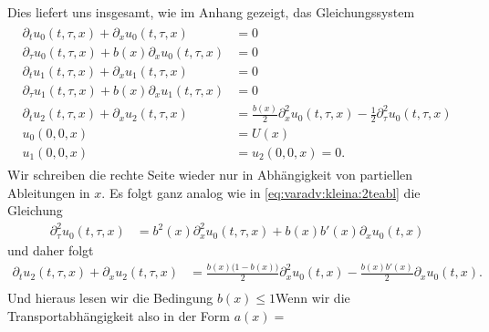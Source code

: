 Dies liefert uns insgesamt, wie im Anhang gezeigt, das Gleichungssystem
\begin{align}
\begin{split}
\partial_t u_0(t, \tau, x) + \partial_x u_0(t, \tau, x) &= 0\\
\partial_\tau u_0(t, \tau, x) + b(x) \partial_x u_0(t, \tau, x) &= 0\\
\partial_t u_1(t, \tau, x) + \partial_x u_1(t, \tau, x) &= 0\\
\partial_\tau u_1(t, \tau, x) + b(x) \partial_x u_1(t, \tau, x) &= 0\\
\partial_t u_2(t, \tau, x) + \partial_x u_2(t, \tau, x) &= \frac{b(x)}{2} \partial^2_x u_0(t, \tau,x) - \frac{1}{2} \partial^2_\tau u_0(t, \tau, x)\\
u_0(0,0,x) &= U(x)\\
u_1(0,0,x) &= u_2(0,0,x) = 0.
\end{split}
\end{align}
Wir schreiben die rechte Seite wieder nur in Abhängigkeit von partiellen Ableitungen in $x$.
Es folgt ganz analog wie in \eqref{eq:varadv:kleina:2teabl} die Gleichung
\begin{align}
\partial^2_\tau u_0(t, \tau, x) %
&= b^2(x) \partial^2_x u_0(t, \tau, x) + b(x) b'(x) \partial_x u_0(t,x)
\end{align}
und daher folgt
\begin{align}
\partial_t u_2(t, \tau, x) + \partial_x u_2(t, \tau, x) &= \frac{b(x) \bigl(1 - b(x)\bigr)}{2} \partial^2_x u_0(t,x) - \frac{b(x)b'(x)}{2} \partial_x u_0(t,x).\\
\end{align}
Und hieraus lesen wir die Bedingung $b(x) \leq 1$Wenn wir die Transportabhängigkeit also in der Form $a(x) =$
